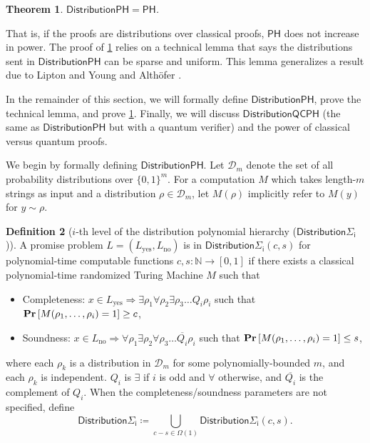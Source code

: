 \documentclass[11pt]{article}
\newtheorem{theorem}{Theorem}[section]
\theoremstyle{definition}
\newtheorem{definition}[theorem]{Definition}
\renewcommand{\Pr}{\mathop{\bf Pr\/}}
\newcommand{\nats}{\mathbb N}
\newcommand{\N}{\nats}
\newcommand{\class}[1]{\ensuremath{\mathsf{#1}}\xspace}
\newcommand{\PH}{\class{PH}}
\newcommand{\distributionPH}{\mixedPH}
\newcommand{\distributionQCPH}{\mathsf{DistributionQCPH}}
\newcommand{\mixedPH}{\class{DistributionPH}}
\newcommand{\mixedSigmai}[1][i]{\mathsf{Distribution\Sigma_{#1}}}
\newcommand{\calD}{\mathcal{D}}
\begin{document}
\begin{theorem}\label{thm:mixedph=ph}
    $\mixedPH = \PH$.
\end{theorem}

That is, if the proofs are distributions over classical proofs, $\PH$ does not increase in power.
The proof of \cref{thm:mixedph=ph} relies on a technical lemma that says the distributions sent in $\mixedPH$ can be sparse and uniform. This lemma generalizes a result due to Lipton and Young \cite{lipton1994simple} and Althöfer \cite{ALTHOFER1994339}. 

In the remainder of this section, we will formally define $\distributionPH$, prove the technical lemma, and prove \cref{thm:mixedph=ph}. 
Finally, we will discuss $\distributionQCPH$ (the same as $\distributionPH$ but with a quantum verifier) and the power of classical versus quantum proofs.


We begin by formally defining $\mixedPH$.
Let $\calD_m$ denote the set of all probability distributions over $\{0,1\}^m$.
For a computation $M$ which takes length-$m$ strings as input and a distribution $\rho\in\calD_m$, let $M(\rho)$ implicitly refer to $M(y)$ for $y\sim \rho$.

\begin{definition}[$i$-th level of the distribution polynomial hierarchy ($\mixedSigmai$)]
    A promise problem $L =(L_{\text{yes}},L_{\text{no}})$ is in $\mixedSigmai(c,s)$ for polynomial-time computable functions $c,s : \N \to [0,1]$ if there exists a classical polynomial-time randomized Turing Machine $M$ such that
    \begin{itemize}
        \item Completeness: $x\in L_{\text{yes}} \Rightarrow \exists \rho_1 \forall \rho_2 \exists \rho_3 \dots Q_i \rho_i$ such that $\Pr\left[M(\rho_1,\dots,\rho_i) = 1\right] \geq c$,
        \item Soundness: $x\in L_{\text{no}} \Rightarrow \forall \rho_1 \exists \rho_2 \forall \rho_3 \dots \overline{Q_i} \rho_i$ such that $\Pr\left[M(\rho_1,\dots,\rho_i) = 1\right] \leq s$,
    \end{itemize}
    where each $\rho_k$ is a distribution in $\calD_m$ for some polynomially-bounded $m$, and each $\rho_k$ is independent.
    $Q_i$ is $\exists$ if $i$ is odd and $\forall$ otherwise, and $\overline{Q_i}$ is the complement of $Q_i$.
    When the completeness/soundness parameters are not specified, define
    \[
        \mixedSigmai[i] \coloneqq \bigcup_{c-s\in\Omega(1)} \mixedSigmai[i](c,s).
    \]
\end{definition}
\end{document}
